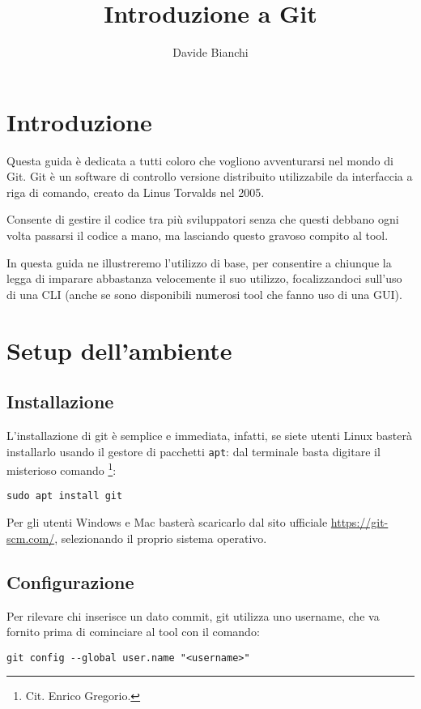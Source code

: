 \documentclass[a4paper, 11pt]{article}
\title{\huge{Introduzione a Git}}
\author{Davide Bianchi}
\begin{document}
	\maketitle
	
	\newpage
	\tableofcontents
	\newpage
	
	\section{Introduzione}
	Questa guida è dedicata a tutti coloro che vogliono avventurarsi nel mondo di Git. Git è un software di controllo versione distribuito utilizzabile da interfaccia a riga di comando, creato da Linus Torvalds nel 2005.
	
	Consente di gestire il codice tra più sviluppatori senza che questi debbano ogni volta passarsi il codice a mano, ma lasciando questo gravoso compito al tool.
	
	In questa guida ne illustreremo l'utilizzo di base, per consentire a chiunque la legga di imparare abbastanza velocemente il suo utilizzo, focalizzandoci sull'uso di una CLI (anche se sono disponibili numerosi tool che fanno uso di una GUI).
	
	\section{Setup dell'ambiente}
	\subsection{Installazione}
	L'installazione di git è semplice e immediata, infatti, se siete utenti Linux basterà installarlo usando il gestore di pacchetti \lstinline|apt|: dal terminale basta digitare il misterioso comando \footnote{Cit. Enrico Gregorio.}: \begin{lstlisting}
sudo apt install git
	\end{lstlisting}
	Per gli utenti Windows e Mac basterà scaricarlo dal sito ufficiale \url{https://git-scm.com/}, selezionando il proprio sistema operativo.
	
	
	\subsection{Configurazione}
	Per rilevare chi inserisce un dato commit, git utilizza uno username, che va fornito prima di cominciare al tool con il comando:
	\begin{lstlisting}
git config --global user.name "<username>"
	\end{lstlisting}
	
\end{document}
